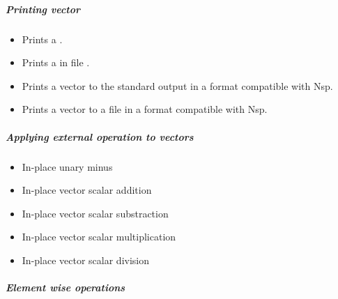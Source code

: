 \subparagraph{Printing vector}
\begin{itemize}
\item {}
  \sshortdescribe Prints a .  
\item {}
  \sshortdescribe Prints a  in file .  
\item {}
  \sshortdescribe Prints a vector to the standard output in a format
  compatible with Nsp.  

\item {}
  \sshortdescribe Prints a vector to a file in a format compatible with Nsp.
\end{itemize}

\subparagraph{Applying external operation to vectors}

\begin{itemize}
\item {}
  \sshortdescribe In-place unary minus
\item {}
  \sshortdescribe In-place vector scalar addition  
\item {}
  \sshortdescribe In-place vector scalar substraction  
\item {}
  \sshortdescribe In-place vector scalar multiplication  
\item {}
  \sshortdescribe In-place vector scalar division  
\end{itemize}

\subparagraph{Element wise operations}

